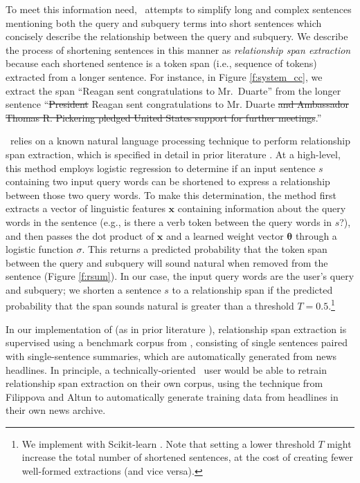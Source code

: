 
To meet this information need, \ours~attempts to simplify long and complex sentences mentioning both the query and subquery terms into short sentences which concisely describe the {relationship} between the query and subquery.
We describe the process of shortening sentences in this manner as \textit{relationship span extraction} because each shortened sentence is a token span (i.e., sequence of tokens) extracted from a longer sentence. 
For instance, in Figure \ref{f:system_cc}, we extract the span ``Reagan sent congratulations to Mr.\ Duarte'' from the longer sentence ``{\color{gray}\sout{President}} Reagan sent congratulations to Mr. Duarte {\color{gray}\sout{and Ambassador Thomas R. Pickering pledged United States support for further meetings}}.''

\ours~relies on a known natural language processing technique to perform relationship span extraction, which is specified in detail in prior literature \cite[Sec.\ 4]{handler-oconnor-2018-relational}.
At a high-level, this method employs logistic regression to determine if an input sentence $s$ containing two input query words can be shortened to express a relationship between those two query words. 
To make this determination, the method first extracts a vector of linguistic features $\bm{x}$ containing information about the query words in the sentence  (e.g., is there a verb token between the query words in $s$?), and then passes the dot product of $\bm{x}$ and a learned weight vector $\bm{\theta}$ through a logistic function $\sigma$. This returns a predicted probability that the token span between the query and subquery will sound natural when removed from the sentence (Figure \ref{f:rsum}).
In our case, the input query words are the user's query and subquery;
we shorten a sentence $s$ to a relationship span if the predicted probability that the span sounds natural is greater than a threshold $T=0.5$.\footnote{We implement with Scikit-learn \cite{Pedregosa:2011:SML:1953048.2078195}. Note that setting a lower threshold $T$ might increase the total number of shortened sentences, at the cost of creating fewer well-formed extractions (and vice versa).}

In our implementation of \ours (as in prior literature \cite{handler-oconnor-2018-relational}), relationship span extraction is supervised using a benchmark corpus from \citet{filippova-altun-2013-overcoming}, consisting of single sentences paired with single-sentence summaries, which are automatically generated from news headlines.
In principle, a technically-oriented \ours~user would be able to retrain relationship span extraction on their own corpus, using the technique from Filippova and Altun to automatically generate training data from headlines in their own news archive.
